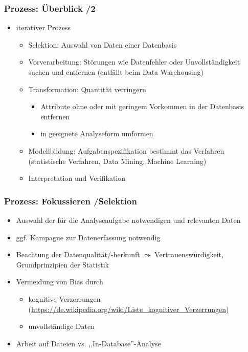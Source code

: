 
\begin{frame}
\frametitle{Prozess: Überblick /2}

\begin{itemize}
\item iterativer Prozess
\begin{itemize}
\item Selektion: Auswahl von Daten einer Datenbasis
\item Vorverarbeitung: Störungen wie Datenfehler oder
  Unvollständigkeit suchen und entfernen (entfällt beim Data Warehousing)
\item Transformation: Quantität verringern
\begin{itemize}
\item Attribute ohne oder mit geringem Vorkommen in der Datenbasis entfernen
\item in geeignete Analyseform umformen
\end{itemize}
\item Modellbildung: Aufgabenspezifikation bestimmt das Verfahren (statistische Verfahren, Data Mining, Machine Learning)
\item Interpretation und Verifikation
\end{itemize}
\end{itemize}


\end{frame}


\begin{frame}
\frametitle{Prozess: Fokussieren /Selektion}

\begin{itemize}
\item Auswahl der für die Analyseaufgabe notwendigen und relevanten Daten
\item ggf. Kampagne zur Datenerfassung notwendig
\item Beachtung der Datenqualität/-herkunft $\leadsto$ Vertrauenswürdigkeit, Grundprinzipien der Statistik
\item Vermeidung von Bias durch
\begin{itemize}
\item kognitive Verzerrungen (\url{https://de.wikipedia.org/wiki/Liste_kognitiver_Verzerrungen})
\item unvollständige Daten
\end{itemize}
\item Arbeit auf Dateien vs. ,,In-Database''-Analyse
\end{itemize}

\end{frame}

